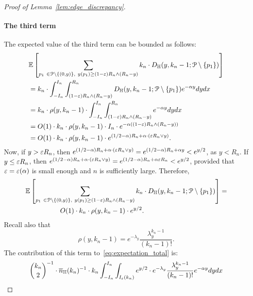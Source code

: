 \begin{proof}[Proof of Lemma~\ref{lem:edge_discrepancy}]
\paragraph{The third term}
The expected value of the third term can be bounded as 
follows: 
\begin{equation*}
\begin{split} 
&\mathbb{E}\left[ \sum_{p_1 \ \in {\mathcal P} \setminus \{(0,y) \}, \ y(p_1) \geq (1-\varepsilon) R_n \wedge (R_n-y)} k_n 
\cdot D_{\mathbb{H}} (y,k_n-1;{\mathcal P} \setminus \{ p_1\})\right] \\
&= k_n \cdot \int_{-I_n}^{I_n} \int_{(1-\varepsilon) R_n \wedge (R_n-y)}^{R_n} 
 D_{\mathbb{H}} (y,k_n-1; {\mathcal P} \setminus \{ p_1\}) 
 e^{-\alpha y} dy dx \\
&= k_n \cdot \rho(y,k_n-1) \cdot \int_{-I_n}^{I_n} \int_{(1-\varepsilon) R_n \wedge (R_n-y)}^{R_n}  e^{-\alpha y} dy dx \\
&= O(1)\cdot k_n \cdot \rho(y,k_n-1) \cdot I_n \cdot 
e^{-\alpha \left( (1-\varepsilon) R_n \wedge (R_n-y)\right)} \\
&= O(1) \cdot k_n \cdot \rho(y,k_n-1) \cdot e^{(1/2 - \alpha)R_n +\alpha \cdot ( \varepsilon R_n \vee y)}.
\end{split}
\end{equation*}
Now, if $y > \varepsilon R_n$, then 
$e^{(1/2 - \alpha)R_n +\alpha \cdot ( \varepsilon R_n \vee y)} = e^{(1/2 - \alpha)R_n +\alpha y}< e^{y/2}$, as $y< R_n$. 
If $y \leq \varepsilon R_n$, then 
$e^{(1/2 - \alpha)R_n +\alpha \cdot ( \varepsilon R_n \vee y)} = e^{(1/2 - \alpha)R_n +\alpha \varepsilon R_n} < e^{y/2}$, provided that $\varepsilon = \varepsilon (\alpha)$ is small enough and $n$ is sufficiently large. 
Therefore, 
\begin{equation*}
\begin{split} 
&\mathbb{E}\left[ \sum_{p_1 \ \in {\mathcal P} \setminus \{(0,y) \}, \ y(p_1) \geq (1-\varepsilon) R_n \wedge (R_n-y)} k_n 
\cdot D_{\mathbb{H}} (y,k_n-1;{\mathcal P} \setminus \{ p_1\})\right]= \\
&\hspace{1.8cm} O(1) \cdot k_n \cdot \rho(y,k_n-1) \cdot e^{y/2}.
\end{split}
\end{equation*}
Recall also that 
$$ \rho(y,k_n-1) = e^{-\lambda_y} 
\frac{\lambda_y^{k_n-1}}{(k_n-1)!}. $$
The contribution 
of this term to~\eqref{eq:expectation_total} is:
\begin{equation*} 
\begin{split}
&{k_n \choose 2}^{-1} \cdot \expH^{-1} \cdot k_n
\int_{-I_n}^{I_n} \int_{I_\eps (k_n)} 
e^{y/2} \cdot e^{-\lambda_y} 
\frac{\lambda_y^{k_n-1}}{(k_n-1)!} e^{-\alpha y} dy dx \\ 

\end{split}
\end{equation*}
\end{proof}
